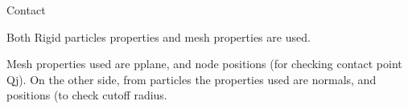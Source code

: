 

Contact

Both Rigid particles properties and mesh properties are used.

Mesh properties used are pplane, and node positions (for checking contact point Qj). On the other side, from particles the properties used are normals, and positions (to check cutoff radius.